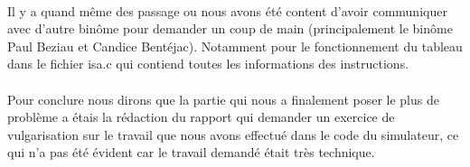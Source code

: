 \documentclass[12pt]{article}
\begin{document}
\paragraph{} Il y a quand même des passage ou nous avons été content d'avoir communiquer avec d'autre binôme pour demander un coup de main (principalement le binôme Paul Beziau et Candice Bentéjac). Notamment pour le fonctionnement du tableau dans le fichier isa.c qui contiend toutes les informations des instructions.

\paragraph{} Pour conclure nous dirons que la partie qui nous a finalement poser le plus de problème a étais la rédaction du rapport qui demander un exercice de vulgarisation sur le travail que nous avons effectué dans le code du simulateur, ce qui n'a pas été évident car le travail demandé était très technique.
\end{document}
